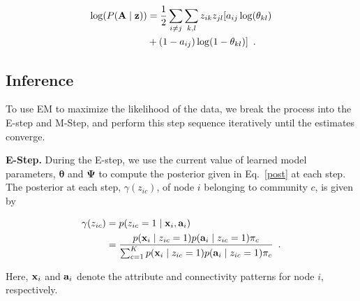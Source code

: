 \documentclass[journal]{IEEEtran}
\begin{document}
\begin{equation}
\begin{split}
\log(P({\bf A} \mid {\bf z}))&=\frac{1}{2}\sum_{i\ne j}\sum_{k,l}z_{ik}z_{jl}[a_{ij}\log (\theta_{kl})\\
&+(1-a_{ij})\log(1-\theta_{kl})]\enspace. 
\end{split}
\end{equation}



\subsection{Inference}
To use EM to maximize the likelihood of the data, we break the process into the E-step and M-Step, and perform this step sequence iteratively until the estimates converge.

\textbf{E-Step.} During the E-step, we use the current value of learned model parameters, ${\boldsymbol \theta}$ and ${\boldsymbol \Psi}$ to compute the posterior given in Eq.~\eqref{post} at each step. The posterior at each step,  $\gamma(z_{ic})$, of node $i$ belonging to community $c$, is given by

\begin{equation}
\begin{split}
\gamma({z_{ic}})& =p(z_{ic}=1\mid {\bf x}_{i}, {\bf a}_{i}) \\
&=\frac{p({\bf x}_{i} \mid z_{ic}=1)p({\bf a}_{i}\mid z_{ic}=1)\pi_{c}}{\sum_{c=1}^{K}p({\bf x}_{i} \mid z_{ic}=1)p({\bf a}_{i}\mid z_{ic}=1)\pi_{c}}\enspace.
\end{split}
\end{equation}

Here, ${\bf x}_{i}$ and ${\bf a}_{i}$ denote the attribute and connectivity patterns for node $i$, respectively. 
\end{document}
